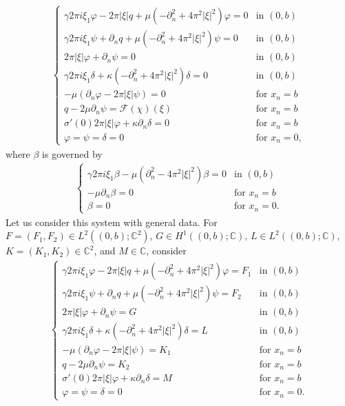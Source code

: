 \documentclass[11pt,letterpaper,reqno]{amsart}
\numberwithin{equation}{section}
\newcommand{\abs}[1]{\left\lvert#1\right\rvert}
\begin{document}
\begin{align}
    \begin{cases}
        \gamma 2\pi i \xi_{1}\varphi - 2\pi \abs{\xi}q+\mu(-\partial_{n}^{2}+4\pi^{2}\abs{\xi}^{2})\varphi = 0 &\mbox{in \((0,b)\)} \\
        \gamma 2\pi i \xi_{1}\psi + \partial_{n}q+\mu(-\partial_{n}^{2}+4\pi^{2}\abs{\xi}^{2})\psi = 0 &\mbox{in \((0,b)\)} \\
        2\pi\abs{\xi}\varphi + \partial_{n}\psi = 0 &\mbox{in \((0,b)\)} \\
        \gamma 2\pi i \xi_{1}\delta + \kappa(-\partial_{n}^{2}+4\pi^{2}\abs{\xi}^{2})\delta = 0 &\mbox{in \((0,b)\)} \\
        -\mu(\partial_{n}\varphi - 2\pi\abs{\xi}\psi)= 0 &\mbox{for \(x_{n}=b\)} \\
        q - 2\mu\partial_{n}\psi = \mathcal{F}(\chi)(\xi) &\mbox{for \(x_{n}=b\)} \\
        \sigma'(0) 2\pi \abs{\xi}\varphi + \kappa\partial_{n}\delta = 0 &\mbox{for \(x_{n}=b\)} \\
        \varphi = \psi = \delta = 0 &\mbox{for \(x_{n}=0\)},
    \end{cases}
\end{align}
where \(\beta\) is governed by
\begin{align}
    \begin{cases}
        \gamma 2\pi i \xi_{1}\beta - \mu(\partial_{n}^{2}-4\pi^{2}\abs{\xi}^{2})\beta = 0 &\mbox{in \((0,b)\)} \\
        -\mu\partial_{n}\beta = 0 &\mbox{for \(x_{n}=b\)} \\
        \beta = 0 &\mbox{for \(x_{n}=0\)}.
    \end{cases}
\end{align}
Let us consider this system with general data. For \(F=(F_{1},F_{2}) \in L^{2}((0,b);\mathbb{C}^{2})\), \(G \in H^{1}((0,b);\mathbb{C})\), \(L \in L^{2}((0,b);\mathbb{C})\), \(K=(K_{1},K_{2}) \in \mathbb{C}^{2}\), and \(M \in \mathbb{C}\), consider
\begin{align}
    \begin{cases}
        \gamma 2\pi i \xi_{1}\varphi-2\pi\abs{\xi}q+\mu(-\partial_{n}^{2}+4\pi^{2}\abs{\xi}^{2})\varphi = F_{1} &\mbox{in \((0,b)\)} \\
        \gamma 2\pi i \xi_{1}\psi+ \partial_{n}q+\mu(-\partial_{n}^{2}+4\pi^{2}\abs{\xi}^{2})\psi = F_{2} &\mbox{in \((0,b)\)} \\
        2\pi \abs{\xi}\varphi + \partial_{n}\psi = G &\mbox{in \((0,b)\)} \\
        \gamma 2\pi i \xi_{1}\delta+\kappa(-\partial_{n}^{2}+4\pi^{2}\abs{\xi}^{2})\delta = L &\mbox{in \((0,b)\)} \\
        -\mu(\partial_{n}\varphi -2\pi\abs{\xi}\psi) = K_{1} &\mbox{for \(x_{n}=b\)} \\
        q-2\mu\partial_{n}\psi=K_{2} &\mbox{for \(x_{n}=b\)} \\
        \sigma'(0)2\pi \abs{\xi}\varphi +\kappa\partial_{n}\delta = M &\mbox{for \(x_{n}=b\)} \\
        \varphi=\psi=\delta=0 &\mbox{for \(x_{n}=0\)}.
    \end{cases}
\end{align}
\end{document}
